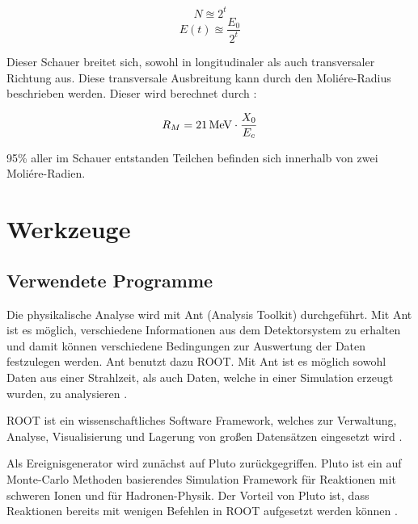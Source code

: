 \documentclass[a4paper,11pt,oneside,final,german,openbib,pdftex]{scrbook}
\begin{document}
{\begin{equation}
N\approxeq 2^t
\end{equation}
\begin{equation}
E(t) \approxeq \frac{E_0}{2^t}
\end{equation}

Dieser Schauer breitet sich, sowohl in longitudinaler als auch transversaler Richtung aus. Diese transversale Ausbreitung kann durch den Moli\'ere-Radius beschrieben werden. 
Dieser wird berechnet durch \cite{Leo87}:

\begin{equation}
R_M = 21\, \textnormal{MeV}\cdot \frac{X_0}{E_c}
\end{equation}

95\% aller im Schauer entstanden Teilchen befinden sich innerhalb von zwei Moli\'ere-Radien. 

















\chapter{Werkzeuge}
\label{chap:Wergzeuge}
\section{Verwendete Programme}

Die physikalische Analyse wird mit Ant (Analysis Toolkit) durchgef\"uhrt. Mit Ant ist es m\"oglich, verschiedene Informationen aus dem Detektorsystem zu erhalten und damit können verschiedene Bedingungen zur Auswertung der Daten festzulegen werden. Ant benutzt dazu ROOT. Mit Ant ist es m\"oglich sowohl Daten aus einer Strahlzeit, als auch Daten, welche in einer Simulation erzeugt wurden, zu analysieren \cite{Ant17}.

ROOT ist ein wissenschaftliches Software Framework, welches zur Verwaltung, Analyse, Visualisierung und Lagerung von gro{\ss}en Datens\"atzen eingesetzt wird \cite{Ce97}.

Als Ereignisgenerator wird zun\"achst auf Pluto zur\"uckgegriffen. Pluto ist ein auf Monte-Carlo Methoden basierendes Simulation Framework f\"ur Reaktionen mit schweren Ionen und f\"ur Hadronen-Physik. Der Vorteil von Pluto ist, dass Reaktionen bereits mit wenigen Befehlen in ROOT aufgesetzt werden k\"onnen \cite{Pl07}. 

}
\end{document}

